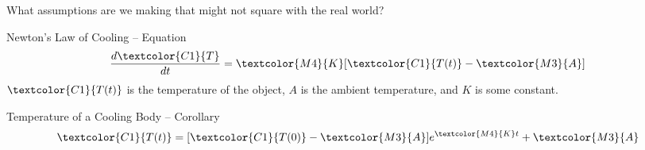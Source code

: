 \begin{frame}
\AnswerNo
What assumptions are we making that might not square with the real world?
\vfill

\begin{block}{Newton's Law of Cooling -- Equation~}
\[\frac{d\textcolor{C1}{T}}{dt} = \textcolor{M4}{K}[\textcolor{C1}{T(t)}-\textcolor{M3}{A}]\]
$\textcolor{C1}{T(t)}$ is the temperature of the object, \textcolor{M3}{$A$} is the ambient temperature, and \textcolor{M4}{$K$} is some constant.
\end{block}


\begin{block}{Temperature of a Cooling Body -- Corollary~}
\[\textcolor{C1}{T(t)} = [\textcolor{C1}{T(0)}-\textcolor{M3}{A}]e^{\textcolor{M4}{K}t}+\textcolor{M3}{A}\]
\end{block}



\end{frame}
